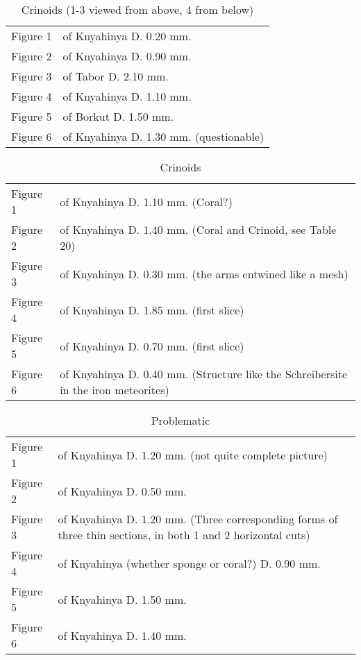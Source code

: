 \documentclass[a4paper, 12pt, oneside]{article}
\begin{document}
\begin{table}[ht!]
\caption{Crinoids (1-3 viewed from above, 4 from below)}
\centering
\begin{tabular}{ p{2cm} p{10cm} }
\hline
 Figure 1 & of Knyahinya D. 0.20 mm. \\
 Figure 2 & of Knyahinya D. 0.90 mm. \\
 Figure 3 & of Tabor D. 2.10 mm. \\
 Figure 4 & of Knyahinya D. 1.10 mm. \\
 Figure 5 & of Borkut D. 1.50 mm. \\
 Figure 6 & of Knyahinya D. 1.30 mm. (questionable)
\end{tabular}
\label{table:29}
\end{table}
\begin{table}[ht!]
\caption{Crinoids}
\centering
\begin{tabular}{ p{2cm} p{10cm} }
\hline
 Figure 1 & of Knyahinya D. 1.10 mm. (Coral?) \\
 Figure 2 & of Knyahinya D. 1.40 mm. (Coral and Crinoid, see Table 20) \\
 Figure 3 & of Knyahinya D. 0.30 mm. (the arms entwined like a mesh) \\
 Figure 4 & of Knyahinya D. 1.85 mm. (first slice) \\
 Figure 5 & of Knyahinya D. 0.70 mm. (first slice) \\
 Figure 6 & of Knyahinya D. 0.40 mm. (Structure like the Schreibersite in the iron meteorites) \\
\end{tabular}
\label{table:30}
\end{table}
\begin{table}[ht!]
\caption{Problematic}
\centering
\begin{tabular}{ p{2cm} p{10cm} }
\hline
 Figure 1 & of Knyahinya D. 1.20 mm. (not quite complete picture) \\
 Figure 2 & of Knyahinya D. 0.50 mm. \\
 Figure 3 & of Knyahinya D. 1.20 mm. (Three corresponding forms of three thin sections, in both 1 and 2 horizontal cuts) \\
 Figure 4 & of Knyahinya (whether sponge or coral?) D. 0.90 mm. \\
 Figure 5 & of Knyahinya D. 1.50 mm. \\
 Figure 6 & of Knyahinya D. 1.40 mm.
\end{tabular}
\label{table:31}
\end{table}
\end{document}
